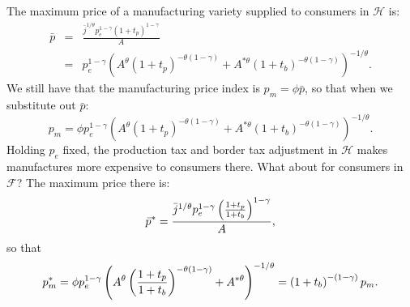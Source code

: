 \documentclass[notitlepage,12pt]{article}
\begin{document}
The maximum price of a manufacturing variety supplied to consumers in $%
\mathcal{H}$ is:%
\begin{eqnarray*}
\bar{p} &=&\frac{\bar{j}^{1/\theta }p_{e}^{1-\gamma }\left( 1+t_{p}\right)
^{1-\gamma }}{A} \\
&=&p_{e}^{1-\gamma }\left( A^{\theta }\left( 1+t_{p}\right) ^{-\theta \left(
1-\gamma \right) }+A^{\ast \theta }\left( 1+t_{b}\right) ^{-\theta \left(
1-\gamma \right) }\right) ^{-1/\theta }.
\end{eqnarray*}%
We still have that the manufacturing price index is $p_{m}=\phi \bar{p}$, so
that when we substitute out $\bar{p}$: 
\begin{equation*}
p_{m}=\phi p_{e}^{1-\gamma }\left( A^{\theta }\left( 1+t_{p}\right)
^{-\theta \left( 1-\gamma \right) }+A^{\ast \theta }\left( 1+t_{b}\right)
^{-\theta \left( 1-\gamma \right) }\right) ^{-1/\theta }.
\end{equation*}%
Holding $p_{e}$ fixed, the production tax and border tax adjustment in $%
\mathcal{H}$ makes manufactures more expensive to consumers there. What
about for consumers in $\mathcal{F}$? The maximum price there is:%
\begin{equation*}
\bar{p}^{\ast }=\frac{\bar{j}^{1/\theta }p_{e}^{1-\gamma }\left( \frac{%
1+t_{p}}{1+t_{b}}\right) ^{1-\gamma }}{A},
\end{equation*}%
so that%
\begin{equation*}
p_{m}^{\ast }=\phi p_{e}^{1-\gamma }\left( A^{\theta }\left( \frac{1+t_{p}}{%
1+t_{b}}\right) ^{-\theta \left( 1-\gamma \right) }+A^{\ast \theta }\right)
^{-1/\theta }=\left( 1+t_{b}\right) ^{-\left( 1-\gamma \right) }p_{m}.
\end{equation*}
\end{document}
